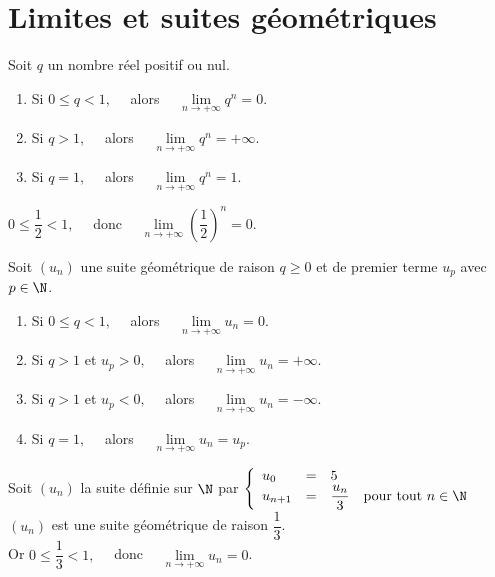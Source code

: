 \documentclass[a4paper,11pt,cours]{nsi} %
\begin{document}
\section{Limites et suites géométriques}
\begin{propriete}[ : Limite de $q^n$]
    Soit $q$ un nombre réel positif ou nul.
    \begin{enumerate}[label=\textbullet]
        \item Si $0\leqslant q < 1, \quad$ alors $\quad \lim\limits_{n\to+\infty} q^n=0$.
        \item Si $ q > 1, \quad$ alors $\quad \lim\limits_{n\to+\infty} q^n=+\infty$.
        \item Si $ q =1, \quad$ alors $\quad \lim\limits_{n\to+\infty} q^n=1$.
    \end{enumerate}
\end{propriete}

\begin{exemple}[]
    $0\leqslant \dfrac{1}{2} <1, \quad$ donc $\quad \lim\limits_{n\to+\infty}\left(\dfrac{1}{2}\right)^n = 0$.
\end{exemple}

\begin{propriete}
    Soit $(u_n)$ une suite géométrique de raison $q\geqslant 0$ et de premier terme $u_p$ avec $p\in\N$.
    \begin{enumerate}[label=\textbullet]
        \item Si $0\leqslant q<1, \quad$ alors $\quad \lim\limits_{n\to+\infty} u_n=0$.
        \item Si $ q>1$ et $u_p>0, \quad$ alors $\quad \lim\limits_{n\to+\infty} u_n=+\infty$.
        \item Si $ q>1$ et $u_p<0, \quad$ alors $\quad \lim\limits_{n\to+\infty} u_n=-\infty$.
        \item Si $ q=1,\quad$ alors $\quad \lim\limits_{n\to+\infty} u_n=u_p$.
    \end{enumerate}
\end{propriete}

\begin{exemple}[]
    Soit $(u_n)$ la suite définie sur $\N$ par $\left\{
		\begin{array}{llll}
			u_0 & = & 5 & \\
			u_{n+1} & = & \dfrac{u_n}{3} & \text{pour tout } n\in\N\\
		\end{array}
    \right. $\\
    $(u_n)$ est une suite géométrique de raison $\dfrac{1}{3}$.\\
    Or $0\leqslant \dfrac{1}{3}<1,\quad$ donc $\quad \lim\limits_{n\to+\infty} u_n=0$.
\end{exemple}
\end{document}
